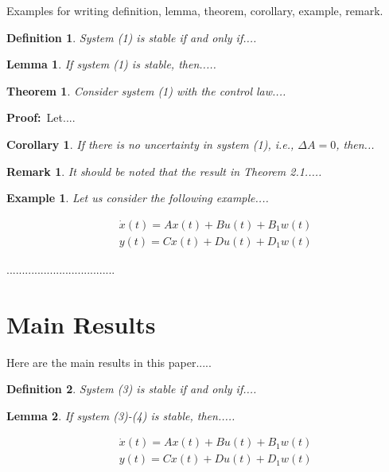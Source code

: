 \documentclass[12pt,a4paper]{jihmsp}
\newtheorem{corollary}{Corollary}[section]
\newtheorem{theorem}{Theorem}[section]
\newtheorem{lemma}{Lemma}[section]
\newtheorem{remark}{Remark}[section]
\newtheorem{definition}{Definition}[section]
\newtheorem{example}{Example}[section]
\begin{document}
	Examples for writing definition, lemma, theorem, corollary, example, remark.
	
	\begin{definition}
		System (1) is stable if and only if....
	\end{definition}
	
	\begin{lemma}
		If system (1) is stable, then.....
	\end{lemma}
	
	\begin{theorem}
		Consider system (1) with the control law....
	\end{theorem}
	
	{\bf Proof:}\ Let....
	
	\begin{corollary}
		If there is no uncertainty in system (1), i.e., $\Delta A=0$, then...
	\end{corollary}
	
	\begin{remark}
		It should be noted that the result in Theorem 2.1.....
	\end{remark}
	
	\begin{example}
		Let us consider the following example....
	\end{example}
	
	\begin{eqnarray}
	&&\dot x(t)=Ax(t)+Bu(t)+B_1w(t)\\
	&&y(t)=Cx(t)+Du(t)+D_1w(t)
	\end{eqnarray}
	
	...................................
	
	
	\section {Main Results}
	
	Here are the main results in this paper.....
	
	\begin{definition}
		System (3) is stable if and only if....
	\end{definition}
	
	\begin{lemma}
		If system (3)-(4) is stable, then.....
	\end{lemma}
	
	\begin{eqnarray}
	&&\dot x(t)=Ax(t)+Bu(t)+B_1w(t)\\
	&&y(t)=Cx(t)+Du(t)+D_1w(t)
	\end{eqnarray}
	
\end{document}
